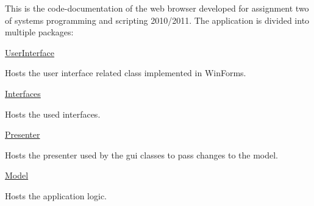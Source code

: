 This is the code-\/documentation of the web browser developed for assignment two of systems programming and scripting 2010/2011. The application is divided into multiple packages:

\hyperlink{namespace_assessment___two}{UserInterface }

Hosts the user interface related class implemented in WinForms.

\hyperlink{namespace_assessment___two___logic_1_1_interfaces}{Interfaces }

Hosts the used interfaces.

\hyperlink{namespace_assessment___two___logic_1_1_presenter}{Presenter }

Hosts the presenter used by the gui classes to pass changes to the model.

\hyperlink{namespace_assessment___two___logic_1_1_model}{Model }

Hosts the application logic. 